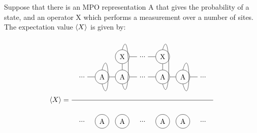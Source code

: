 Suppose that there is an MPO representation A that gives the probability of a state, and an operator X which performs a measurement over a number of sites. The expectation value $ \Braket{X}$ is given by:
\begin{equation}
    \Braket{X} = \frac{
        \begin{tikzpicture} [   ]
            \clip (-1.5,-1) rectangle (5.5,2);

            \node[] (N0) at (-1,0) {...};
            \node[circle, draw] (N1) at (0,0) {A};
            \node[circle, draw] (N2) at (1,0) {A};
            \node[circle, draw] (X2) at (1,1) {X};

            \node[] (N3) at (2 ,0) {...};
            \node[] (X3) at (2,1) {...};

            \node[circle, draw] (N4) at (3 ,0) {A};
            \node[circle, draw] (X4) at (3,1) {X};

            \node[circle, draw] (N5) at (4 ,0) {A};
            \node[] (N6) at (5 ,0) {...};

            \draw  (N0) -- (N1) ;

            \draw  (N1) -- (N2) ;
            \draw  (N2) -- (N3) ;
            \draw  (N3) -- (N4) ;
            \draw  (N4) -- (N5) ;
            \draw  (N5) -- (N6) ;

            \draw  (X2) -- (X3) ;
            \draw  (X3) -- (X4) ;

            \draw  (N2) -- (X2) ;
            \draw  (N4) -- (X4) ;

            \draw (X2.north)   .. controls +(0.4,1.4) and +(0.4,-1.4) .. (N2.south);
            \draw (X4.north)   .. controls +(0.4,1.4) and +(0.4,-1.4) .. (N4.south);

            \draw (N1.north)   .. controls +(0.4,1.4) and +(0.4,-1.4) .. (N1.south);
            \draw (N5.north)   ..  controls +(0.4,1.4) and +(0.4,-1.4)  .. (N5.south);
        \end{tikzpicture}
    }{
        \begin{tikzpicture} [   ]

            \clip  (-1.5,-3) rectangle (5.5,-1);

            \node[] (O0) at (-1,-2) {...};
            \node[circle, draw] (O1) at (0,-2) {A};
            \node[circle, draw] (O2) at (1,-2) {A};

            \node[] (O3) at (2 ,-2) {...};
            \node[circle, draw] (O4) at (3 ,-2) {A};

            \node[circle, draw] (O5) at (4 ,-2) {A};
            \node[] (O6) at (5 ,-2) {...};


\end{tikzpicture}}
\end{equation}
